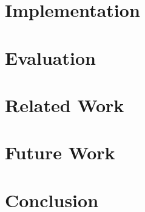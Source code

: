 \documentclass[acmlarge,review,anonymous]{acmart}\settopmatter{printfolios=true}
\begin{document}
    \section{Implementation}\label{sec:impl}
    
    
    
    \section{Evaluation}\label{sec:eval}
    
    
    \section{Related Work}\label{sec:rw}
    

    \section{Future Work}\label{sec:fw}
    
    
    \section{Conclusion}\label{sec:conc}
    
    


\end{document}
